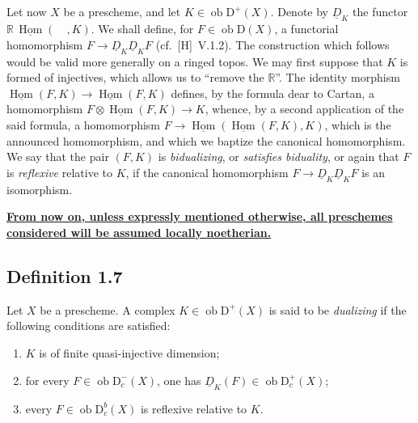 \documentclass[11pt]{article}
\DeclareMathOperator{\Hom}{Hom}
\newcommand{\D}{\mathrm{D}}
\newcommand{\ob}{\operatorname{ob}}
\providecommand{\Hom}{\operatorname{Hom}}
\providecommand{\ob}{\operatorname{ob}}
\providecommand{\Hom}{\operatorname{Hom}}
\begin{document}
Let now $X$ be a prescheme, and let $K \in \ob \D^{+}(X)$. Denote by $\underline{D}_K$ the functor $\mathbb{R}\,\underline{\Hom}(\quad, K)$. We shall define, for $F \in \ob \D(X)$, a functorial homomorphism $F \to \underline{D}_K \underline{D}_K F$ (cf.~[H]~V.1.2). The construction which follows would be valid more generally on a ringed topos. We may first suppose that $K$ is formed of injectives, which allows us to ``remove the $\mathbb{R}$''. The identity morphism $\underline{\Hom}(F,K) \to \underline{\Hom}(F,K)$ defines, by the formula dear to Cartan, a homomorphism $F \otimes \underline{\Hom}(F,K) \to K$, whence, by a second application of the said formula, a homomorphism $F \to \underline{\Hom}(\underline{\Hom}(F,K), K)$, which is the announced homomorphism, and which we baptize the canonical homomorphism. We say that the pair $(F,K)$ is \emph{bidualizing}, or \emph{satisfies biduality}, or again that $F$ is \emph{reflexive} relative to $K$, if the canonical homomorphism $F \to \underline{D}_K \underline{D}_K F$ is an isomorphism.

\textbf{\uline{From now on, unless expressly mentioned otherwise, all preschemes considered will be assumed locally noetherian.}}

\subsection*{Definition 1.7}
Let $X$ be a prescheme. A complex $K \in \ob \D^{+}(X)$ is said to be \emph{dualizing} if the following conditions are satisfied:
\begin{enumerate}[label=(\roman*)]
\item $K$ is of finite quasi-injective dimension;
\item for every $F \in \ob \D_c^{-}(X)$, one has $\underline{D}_K(F) \in \ob \D_c^{+}(X)$;
\item every $F \in \ob \D_c^{b}(X)$ is reflexive relative to $K$.
\end{enumerate}
\end{document}
